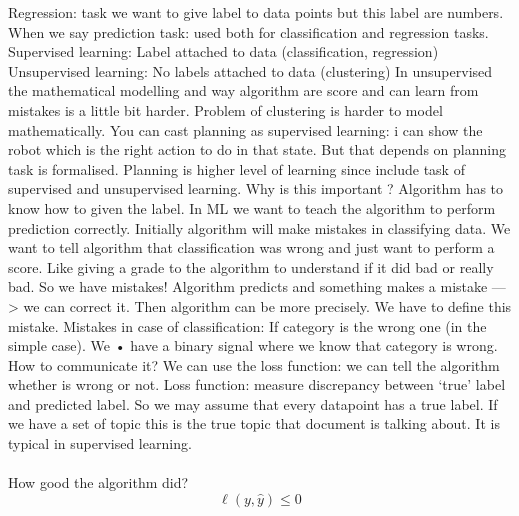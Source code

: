 \documentclass[12pt]{article}
\begin{document}
Regression: task we want to give label to data points but this label are
numbers.
When we say prediction task: used both for classification and regression
tasks.
Supervised learning: Label attached to data (classification, regression)
Unsupervised learning: No labels attached to data (clustering)
In unsupervised the mathematical modelling and way algorithm are score and
can learn from mistakes is a little bit harder. Problem of clustering is harder to
model mathematically.
You can cast planning as supervised learning: i can show the robot which is
the right action to do in that state. But that depends on planning task is
formalised.
Planning is higher level of learning since include task of supervised and
unsupervised learning.
Why is this important ?
Algorithm has to know how to given the label.
In ML we want to teach the algorithm to perform prediction correctly. Initially
algorithm will make mistakes in classifying data. We want to tell algorithm that
classification was wrong and just want to perform a score. Like giving a grade
to the algorithm to understand if it did bad or really bad.
So we have mistakes!
Algorithm predicts and something makes a mistake —> we can correct it.
Then algorithm can be more precisely.
We have to define this mistake.
Mistakes in case of classification:
If category is the wrong one (in the simple case). We • have a binary signal
where we know that category is wrong.
How to communicate it?
We can use the loss function: we can tell the algorithm whether is wrong or
not.
Loss function: measure discrepancy between ‘true’ label and predicted
label.
So we may assume that every datapoint has a true label.
If we have a set of topic this is the true topic that document is talking about.
It is typical in supervised learning.
\\\\
How good the algorithm did?
\\

\[\ell(y,\hat{y})\leq0 \]
\end{document}
